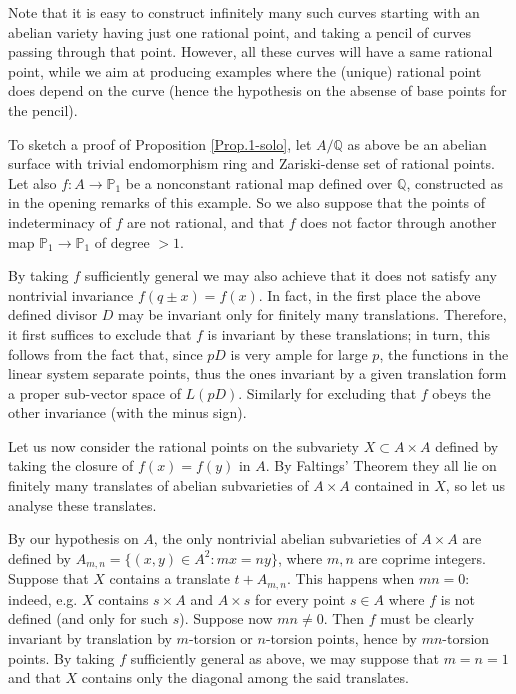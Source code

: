 \documentclass[leqno,12pt]{article} %
\def\Q{{{\mathbb Q}}}
\def\P{{{\mathbb P}}}
\theoremstyle{plain} %
\theoremstyle{definition} %
\begin{document}
 


Note that it is easy to construct infinitely many such curves starting with an abelian variety having just one rational point, and taking a pencil of curves passing through that point. However, all these curves will have a same rational point, while we aim at producing examples where the (unique) rational point does depend on the curve (hence the hypothesis on the absense of base points for the pencil).   



\smallskip

To sketch a proof of  Proposition \ref{Prop.1-solo}, let $A/\Q$ as above be an  abelian surface with trivial endomorphism ring and Zariski-dense set of rational points. Let also  $f:A\to\P_1$ be a nonconstant rational map defined over $\Q$, constructed as in the opening remarks of this example. So we also suppose that the points of indeterminacy of $f$ are not rational, and that $f$ does not factor through another map $\P_1\to\P_1$ of degree $>1$. 

 By taking $f$ sufficiently general we may also achieve that it %
does not satisfy any nontrivial  invariance $f(q\pm x)=f(x)$. In fact, in the first place the above defined divisor  $D$ may be invariant only for finitely many translations. Therefore, it first suffices to exclude that $f$ is invariant by these translations; in turn, this follows from the fact that, since $pD$ is very ample for large $p$, the functions in the linear system separate points, thus the ones invariant by a given translation form a proper sub-vector space of $L(pD)$. Similarly for excluding that $f$ obeys the other invariance (with the minus sign). 

Let us now consider the rational points on the subvariety $X\subset A\times A$ defined by taking the closure of  $f(x)=f(y)$ in $A$. By   Faltings' Theorem   they all lie on finitely many translates of abelian subvarieties of $A\times A$ contained in $X$, so let us analyse these translates.

By our hypothesis on $A$, the only nontrivial abelian subvarieties of $A\times A$ are defined by $A_{m,n}=\{(x,y)\in A^2: mx=ny\}$, where $m,n$ are coprime integers. Suppose that  $X$ contains a translate $t+A_{m,n}$. This happens when $mn=0$: indeed, e.g. $X$ contains $s\times A$ and $A\times s$ for every point $s\in A$ where $f$ is not defined (and only for such $s$). Suppose now $mn\neq 0$. Then $f$ must be  clearly invariant by translation by $m$-torsion or $n$-torsion points, hence by $mn$-torsion points. %
By taking $f$ sufficiently general as above,   we may suppose that $m=n=1$ and that $X$ contains only the diagonal among the said translates.
\end{document}
